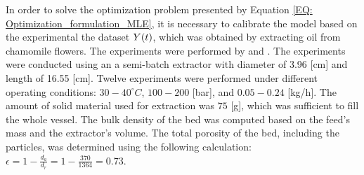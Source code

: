 \documentclass[../Article_Model_Parameters.tex]{subfiles}
\begin{document}
	
	\label{CH: Experiments}
	
	
	
	In order to solve the optimization problem presented by Equation \ref{EQ: Optimization_formulation_MLE}, it is necessary to calibrate the model based on the experimental the dataset ${\color{black}Y}(t)$, which was obtained by extracting oil from chamomile flowers. The experiments were performed by \citet{Povh2001} and \citet{Rahimi2011}.	The experiments were conducted using an a semi-batch extractor with diameter of 3.96 [cm] and length of 16.55 [cm]. Twelve experiments were performed under different operating conditions: $30-40^\circ C$, $100 - 200$ [bar], and $0.05 - 0.24$ [kg/h]. The amount of solid material used for extraction was $75$ [g], which was sufficient to fill the whole vessel. The bulk density of the bed was computed based on the feed's mass and the extractor's volume. The total porosity of the bed, including the particles, was determined using the following calculation: $\epsilon=1-\frac{d_a}{d_r} = 1-\frac{370}{1364} = 0.73$. 
	
\end{document}
